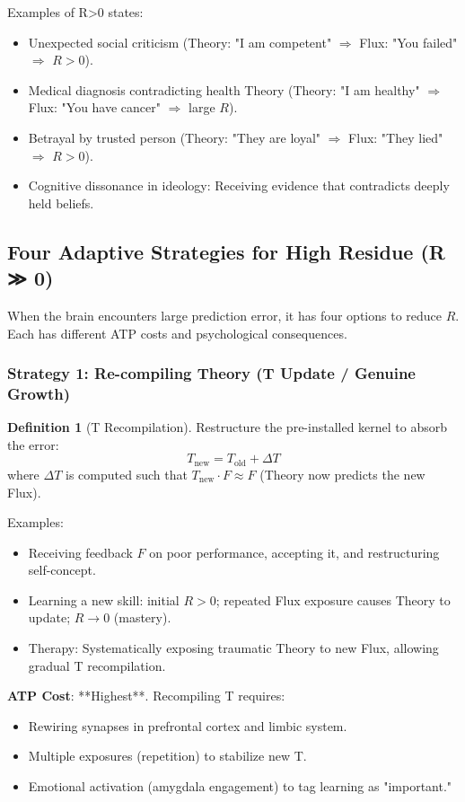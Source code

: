 \documentclass[11pt,oneside]{article}
\theoremstyle{definition}
\newtheorem{definition}[theorem]{Definition}
\begin{document}
Examples of R>0 states:
\begin{itemize}
  \item Unexpected social criticism (Theory: "I am competent" $\Rightarrow$ Flux: "You failed" $\Rightarrow$ $R > 0$).
  \item Medical diagnosis contradicting health Theory (Theory: "I am healthy" $\Rightarrow$ Flux: "You have cancer" $\Rightarrow$ large $R$).
  \item Betrayal by trusted person (Theory: "They are loyal" $\Rightarrow$ Flux: "They lied" $\Rightarrow$ $R > 0$).
  \item Cognitive dissonance in ideology: Receiving evidence that contradicts deeply held beliefs.
\end{itemize}

\subsection{Four Adaptive Strategies for High Residue (R ≫ 0)}

When the brain encounters large prediction error, it has four options to reduce $R$. Each has different ATP costs and psychological consequences.

\subsubsection{Strategy 1: Re-compiling Theory (T Update / Genuine Growth)}

\begin{definition}[T Recompilation]
Restructure the pre-installed kernel to absorb the error:
\[
T_{\text{new}} = T_{\text{old}} + \Delta T
\]
where $\Delta T$ is computed such that $T_{\text{new}} \cdot F \approx F$ (Theory now predicts the new Flux).
\end{definition}

Examples:
\begin{itemize}
  \item Receiving feedback $F$ on poor performance, accepting it, and restructuring self-concept.
  \item Learning a new skill: initial $R > 0$; repeated Flux exposure causes Theory to update; $R \to 0$ (mastery).
  \item Therapy: Systematically exposing traumatic Theory to new Flux, allowing gradual T recompilation.
\end{itemize}

\textbf{ATP Cost}: **Highest**. Recompiling T requires:
\begin{itemize}
  \item Rewiring synapses in prefrontal cortex and limbic system.
  \item Multiple exposures (repetition) to stabilize new T.
  \item Emotional activation (amygdala engagement) to tag learning as "important."
\end{itemize}
\end{document}
